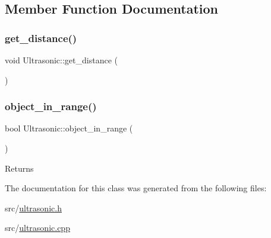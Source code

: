 \subsection{Member Function Documentation}
\mbox{\label{class_ultrasonic_a3d4ff1956578fb0bec95ee140d30b751}} 
\subsubsection{\texorpdfstring{get\+\_\+distance()}{get\_distance()}}
{\footnotesize\ttfamily void Ultrasonic\+::get\+\_\+distance (\begin{DoxyParamCaption}{ }\end{DoxyParamCaption})}

\mbox{\label{class_ultrasonic_aae6ae7ff42f37a52835dc66bba7e0201}} 
\subsubsection{\texorpdfstring{object\+\_\+in\+\_\+range()}{object\_in\_range()}}
{\footnotesize\ttfamily bool Ultrasonic\+::object\+\_\+in\+\_\+range (\begin{DoxyParamCaption}{ }\end{DoxyParamCaption})}

\begin{DoxyReturn}{Returns}

\end{DoxyReturn}


The documentation for this class was generated from the following files\+:\begin{DoxyCompactItemize}
\item 
src/\mbox{\hyperlink{ultrasonic_8h}{ultrasonic.\+h}}\item 
src/\mbox{\hyperlink{ultrasonic_8cpp}{ultrasonic.\+cpp}}\end{DoxyCompactItemize}
